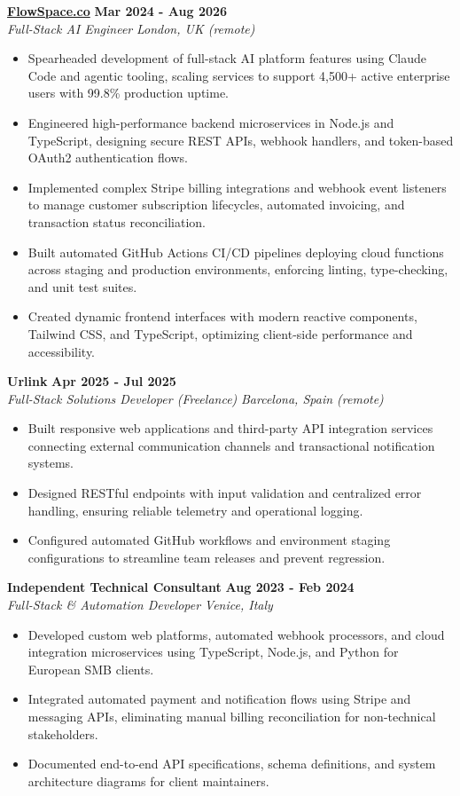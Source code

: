 \documentclass[10pt,a4paper]{article}
\newcommand{\role}[4]{%
  \textbf{#1} \hfill \textbf{#2}\\[1pt]%
  \textit{#3} \hfill \textit{#4}\\[2pt]%
}
\begin{document}
\role{\href{https://flowspace.co}{FlowSpace.co}}{Mar 2024 - Aug 2026}{Full-Stack AI Engineer}{London, UK (remote)}
\begin{itemize}
  \item Spearheaded development of full-stack AI platform features using Claude Code and agentic tooling, scaling services to support 4,500+ active enterprise users with 99.8\% production uptime.
  \item Engineered high-performance backend microservices in Node.js and TypeScript, designing secure REST APIs, webhook handlers, and token-based OAuth2 authentication flows.
  \item Implemented complex Stripe billing integrations and webhook event listeners to manage customer subscription lifecycles, automated invoicing, and transaction status reconciliation.
  \item Built automated GitHub Actions CI/CD pipelines deploying cloud functions across staging and production environments, enforcing linting, type-checking, and unit test suites.
  \item Created dynamic frontend interfaces with modern reactive components, Tailwind CSS, and TypeScript, optimizing client-side performance and accessibility.
\end{itemize}

\role{Urlink}{Apr 2025 - Jul 2025}{Full-Stack Solutions Developer (Freelance)}{Barcelona, Spain (remote)}
\begin{itemize}
  \item Built responsive web applications and third-party API integration services connecting external communication channels and transactional notification systems.
  \item Designed RESTful endpoints with input validation and centralized error handling, ensuring reliable telemetry and operational logging.
  \item Configured automated GitHub workflows and environment staging configurations to streamline team releases and prevent regression.
\end{itemize}

\role{Independent Technical Consultant}{Aug 2023 - Feb 2024}{Full-Stack \& Automation Developer}{Venice, Italy}
\begin{itemize}
  \item Developed custom web platforms, automated webhook processors, and cloud integration microservices using TypeScript, Node.js, and Python for European SMB clients.
  \item Integrated automated payment and notification flows using Stripe and messaging APIs, eliminating manual billing reconciliation for non-technical stakeholders.
  \item Documented end-to-end API specifications, schema definitions, and system architecture diagrams for client maintainers.
\end{itemize}
\end{document}

